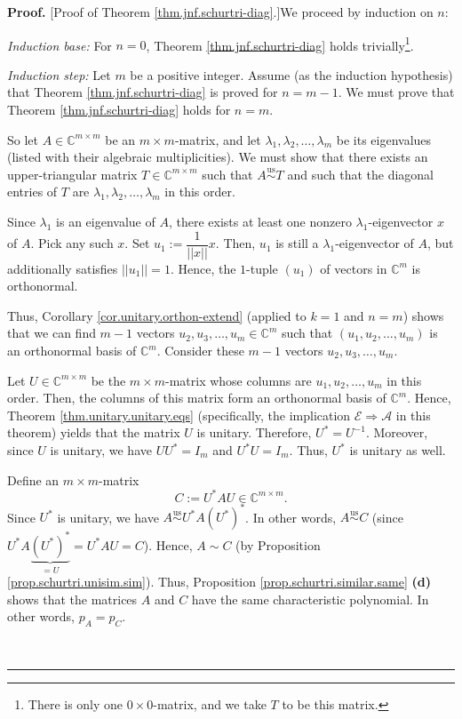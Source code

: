 \documentclass[numbers=enddot,12pt,final,onecolumn,notitlepage]{scrartcl}%
\numberwithin{exer}{subsection}
\theoremstyle{definition}
\newenvironment{proof}[1][Proof]{\noindent\textbf{#1.} }{\ \rule{0.5em}{0.5em}}
\begin{document}
\begin{proof}
[Proof of Theorem \ref{thm.jnf.schurtri-diag}.]We proceed by induction on $n$:

\textit{Induction base:} For $n=0$, Theorem \ref{thm.jnf.schurtri-diag} holds
trivially\footnote{There is only one $0\times0$-matrix, and we take $T$ to be
this matrix.}.

\textit{Induction step:} Let $m$ be a positive integer. Assume (as the
induction hypothesis) that Theorem \ref{thm.jnf.schurtri-diag} is proved for
$n=m-1$. We must prove that Theorem \ref{thm.jnf.schurtri-diag} holds for
$n=m$.

So let $A\in\mathbb{C}^{m\times m}$ be an $m\times m$-matrix, and let
$\lambda_{1},\lambda_{2},\ldots,\lambda_{m}$ be its eigenvalues (listed with
their algebraic multiplicities). We must show that there exists an
upper-triangular matrix $T\in\mathbb{C}^{m\times m}$ such that
$A\overset{\operatorname*{us}}{\sim}T$ and such that the diagonal entries of
$T$ are $\lambda_{1},\lambda_{2},\ldots,\lambda_{m}$ in this order.

Since $\lambda_{1}$ is an eigenvalue of $A$, there exists at least one nonzero
$\lambda_{1}$-eigenvector $x$ of $A$. Pick any such $x$. Set $u_{1}:=\dfrac
{1}{\left\vert \left\vert x\right\vert \right\vert }x$. Then, $u_{1}$ is still
a $\lambda_{1}$-eigenvector of $A$, but additionally satisfies $\left\vert
\left\vert u_{1}\right\vert \right\vert =1$. Hence, the $1$-tuple $\left(
u_{1}\right)  $ of vectors in $\mathbb{C}^{m}$ is orthonormal.

Thus, Corollary \ref{cor.unitary.orthon-extend} (applied to $k=1$ and $n=m$)
shows that we can find $m-1$ vectors $u_{2},u_{3},\ldots,u_{m}\in
\mathbb{C}^{m}$ such that $\left(  u_{1},u_{2},\ldots,u_{m}\right)  $ is an
orthonormal basis of $\mathbb{C}^{m}$. Consider these $m-1$ vectors
$u_{2},u_{3},\ldots,u_{m}$.

Let $U\in\mathbb{C}^{m\times m}$ be the $m\times m$-matrix whose columns are
$u_{1},u_{2},\ldots,u_{m}$ in this order. Then, the columns of this matrix
form an orthonormal basis of $\mathbb{C}^{m}$. Hence, Theorem
\ref{thm.unitary.unitary.eqs} (specifically, the implication $\mathcal{E}%
\Longrightarrow\mathcal{A}$ in this theorem) yields that the matrix $U$ is
unitary. Therefore, $U^{\ast}=U^{-1}$. Moreover, since $U$ is unitary, we have
$UU^{\ast}=I_{m}$ and $U^{\ast}U=I_{m}$. Thus, $U^{\ast}$ is unitary as well.

Define an $m\times m$-matrix%
\[
C:=U^{\ast}AU\in\mathbb{C}^{m\times m}.
\]
Since $U^{\ast}$ is unitary, we have $A\overset{\operatorname*{us}}{\sim
}U^{\ast}A\left(  U^{\ast}\right)  ^{\ast}$. In other words,
$A\overset{\operatorname*{us}}{\sim}C$ (since $U^{\ast}A\underbrace{\left(
U^{\ast}\right)  ^{\ast}}_{=U}=U^{\ast}AU=C$). Hence, $A\sim C$ (by
Proposition \ref{prop.schurtri.unisim.sim}). Thus, Proposition
\ref{prop.schurtri.similar.same} \textbf{(d)} shows that the matrices $A$ and
$C$ have the same characteristic polynomial. In other words, $p_{A}=p_{C}$.


\end{proof}
\end{document}

